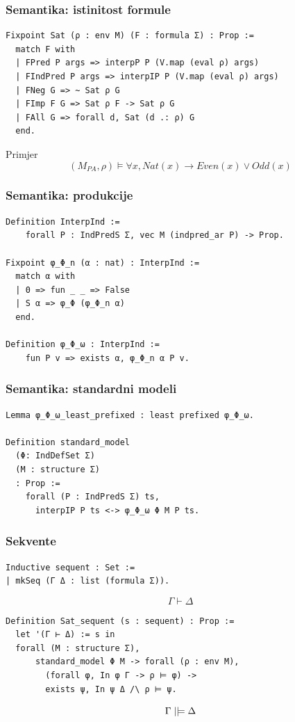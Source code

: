 \documentclass{beamer}
\DeclareRobustCommand{\VDash}{\mathrel{||}\joinrel\Relbar}
\begin{document}
\begin{frame}[fragile]
  \frametitle{Semantika: istinitost formule}
\begin{verbatim}
Fixpoint Sat (ρ : env M) (F : formula Σ) : Prop :=
  match F with
  | FPred P args => interpP P (V.map (eval ρ) args)
  | FIndPred P args => interpIP P (V.map (eval ρ) args)
  | FNeg G => ~ Sat ρ G
  | FImp F G => Sat ρ F -> Sat ρ G
  | FAll G => forall d, Sat (d .: ρ) G
  end.
\end{verbatim}
  \begin{block}{Primjer}
    \[
      (M_{\mathit{PA}}, \rho) \vDash \forall x, \mathit{Nat}(x) \rightarrow \mathit{Even}(x) \lor \mathit{Odd}(x)
    \]
  \end{block}
\end{frame}

\begin{frame}[fragile]
  \frametitle{Semantika: produkcije}
\begin{verbatim}
Definition InterpInd :=
    forall P : IndPredS Σ, vec M (indpred_ar P) -> Prop.

Fixpoint φ_Φ_n (α : nat) : InterpInd :=
  match α with
  | 0 => fun _ _ => False
  | S α => φ_Φ (φ_Φ_n α)
  end.

Definition φ_Φ_ω : InterpInd :=
    fun P v => exists α, φ_Φ_n α P v.
\end{verbatim}
\end{frame}

\begin{frame}[fragile]
  \frametitle{Semantika: standardni modeli}
\begin{verbatim}
Lemma φ_Φ_ω_least_prefixed : least prefixed φ_Φ_ω.

Definition standard_model
  (Φ: IndDefSet Σ)
  (M : structure Σ)
  : Prop :=
    forall (P : IndPredS Σ) ts,
      interpIP P ts <-> φ_Φ_ω Φ M P ts.
\end{verbatim}
\end{frame}

\begin{frame}
  \frametitle{Sekvente}
\begin{verbatim}
Inductive sequent : Set :=
| mkSeq (Γ Δ : list (formula Σ)).
\end{verbatim}
  \[
    \Gamma \vdash \Delta
  \]

\begin{verbatim}
Definition Sat_sequent (s : sequent) : Prop :=
  let '(Γ ⊢ Δ) := s in            
  forall (M : structure Σ),
      standard_model Φ M -> forall (ρ : env M),
        (forall φ, In φ Γ -> ρ ⊨ φ) ->
        exists ψ, In ψ Δ /\ ρ ⊨ ψ.
\end{verbatim}
  \[
    \Gamma \VDash \Delta
  \]
\end{frame}
\end{document}
